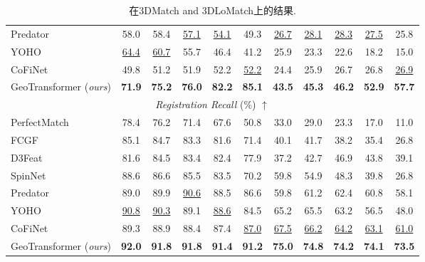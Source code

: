 \begin{table}[!t]
\begin{tabular}{l|ccccc|ccccc}
  Predator~\cite{huang2021predator} & 58.0 & 58.4 & \underline{57.1} & \underline{54.1} & 49.3 & \underline{26.7} & \underline{28.1} & \underline{28.3} & \underline{27.5} & 25.8 \\
  YOHO~\cite{wang2021you} & \underline{64.4} & \underline{60.7} & 55.7 & 46.4 & 41.2 & 25.9 & 23.3 & 22.6 & 18.2 & 15.0 \\
  CoFiNet~\cite{yu2021cofinet} & 49.8 & 51.2 & 51.9 & 52.2 & \underline{52.2} & 24.4 & 25.9 & 26.7 & 26.8 & \underline{26.9} \\
  GeoTransformer (\emph{ours}) & \textbf{71.9} & \textbf{75.2} & \textbf{76.0} & \textbf{82.2} & \textbf{85.1} & \textbf{43.5} & \textbf{45.3} & \textbf{46.2} & \textbf{52.9} & \textbf{57.7} \\
  \midrule
  \multicolumn{11}{c}{\emph{Registration Recall} (\%) $\uparrow$} \\
  \midrule
  PerfectMatch~\cite{gojcic2019perfect} & 78.4 & 76.2 & 71.4 & 67.6 & 50.8 & 33.0 & 29.0 & 23.3 & 17.0 & 11.0 \\
  FCGF~\cite{choy2019fully} & 85.1 & 84.7 & 83.3 & 81.6 & 71.4 & 40.1 & 41.7 & 38.2 & 35.4 & 26.8  \\
  D3Feat~\cite{bai2020d3feat} & 81.6 & 84.5 & 83.4 & 82.4 & 77.9 & 37.2 & 42.7 & 46.9 & 43.8 & 39.1 \\
  SpinNet~\cite{ao2021spinnet} & 88.6 & 86.6 & 85.5 & 83.5 & 70.2 & 59.8 & 54.9 & 48.3 & 39.8 & 26.8 \\
  Predator~\cite{huang2021predator} & 89.0 & 89.9 & \underline{90.6} & 88.5 & 86.6 & 59.8 & 61.2 & 62.4 & 60.8 & 58.1 \\
  YOHO~\cite{wang2021you} & \underline{90.8} & \underline{90.3} & 89.1 & \underline{88.6} & 84.5 & 65.2 & 65.5 & 63.2 & 56.5 & 48.0 \\
  CoFiNet~\cite{yu2021cofinet} & 89.3 & 88.9 & 88.4 & 87.4 & \underline{87.0} & \underline{67.5} & \underline{66.2} & \underline{64.2} & \underline{63.1} & \underline{61.0} \\
  GeoTransformer (\emph{ours}) & \textbf{92.0} & \textbf{91.8} & \textbf{91.8} & \textbf{91.4} & \textbf{91.2} & \textbf{75.0} & \textbf{74.8} & \textbf{74.2} & \textbf{74.1} & \textbf{73.5} \\
  \bottomrule
  \end{tabular}
  \vspace{-5pt}
  \caption{
 在3DMatch and 3DLoMatch上的结果.
  }
  \label{table:results-3dmatch}
  \vspace{-10pt}
  \end{table}

